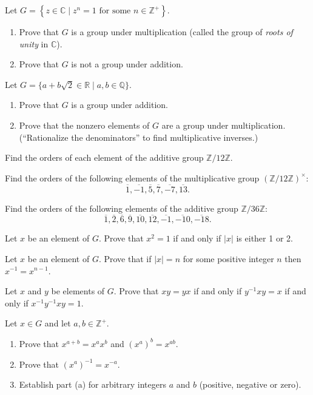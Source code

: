 \documentclass[
    11pt,a4paper,
]{exam}
\begin{document}
\begin{questions}
    \question
    Let \(G=\left\{z \in \mathbb{C} \mid z^n=1 \text{ for some }n \in \mathbb{Z}^{+}\right\}\).
    \begin{enumerate}[label=(\alph*)]
        \item Prove that \(G\) is a group under multiplication (called the group of \textit{roots of unity} in \(\mathbb{C}\)).
        \item Prove that \(G\) is not a group under addition.
    \end{enumerate}
    
    
    \question
    Let \(G=\{a+b \sqrt{2} \in \mathbb{R} \mid a, b \in \mathbb{Q}\}\).
    \begin{enumerate}[label=(\alph*)]
        \item Prove that \(G\) is a group under addition.
        \item Prove that the nonzero elements of \(G\) are a group under multiplication. (``Rationalize the denominators'' to find multiplicative inverses.)
    \end{enumerate}
    
    
    \question
    Find the orders of each element of the additive group \(\mathbb{Z} / 12 \mathbb{Z}\).
    
    \question
    Find the orders of the following elements of the multiplicative group \((\mathbb{Z} / 12 \mathbb{Z})^\times\):
    \[\overline{1}, \overline{-1}, \overline{5}, \overline{7}, \overline{-7}, \overline{13}.\]
    
    \question
    Find the orders of the following elements of the additive group \(\mathbb{Z} / 36 \mathbb{Z}\):
    \[ \overline{1}, \overline{2}, \overline{6}, \overline{9}, \overline{10}, \overline{12}, \overline{-1},\overline{-10},\overline{-18}.\]
    
    
    
    \question
    Let \(x\) be an element of \(G\). Prove that \(x^2=1\) if and only if \(|x|\) is either 1 or 2.
    
    \question
    Let \(x\) be an element of \(G\). Prove that if \(|x|=n\) for some positive integer \(n\) then \(x^{-1}=x^{n-1}\).
    
    \question
    Let \(x\) and \(y\) be elements of \(G\). Prove that \(x y=y x\) if and only if \(y^{-1} x y=x\) if and only if \(x^{-1} y^{-1} x y=1\).
    
    
    \question
    Let \(x \in G\) and let \(a, b \in \mathbb{Z}^{+}\).
    \begin{enumerate}[label=(\alph*)]
        \item Prove that \(x^{a+b}=x^a x^b \) and \(\left(x^a\right)^b=x^{a b}\).
        \item Prove that \(\left(x^a\right)^{-1}=x^{-a}\).
        \item Establish part (a) for arbitrary integers \(a\) and \(b\) (positive, negative or zero).
    \end{enumerate}
    

\end{questions}
\end{document}
